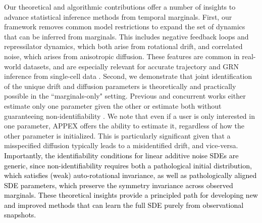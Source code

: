 \documentclass[twoside,11pt]{article}
\newcommand{\rv}[1]{\textcolor{black}{#1}}
\begin{document}
Our theoretical and algorithmic contributions offer a number of insights to advance statistical inference methods from temporal marginals. First, our framework removes common model restrictions to expand the set of dynamics that can be inferred from marginals. This includes negative feedback loops and repressilator dynamics, which both arise from rotational drift, and correlated noise, which arises from anisotropic diffusion. These features are common in real-world datasets, and are especially relevant for accurate trajectory and GRN inference from single-cell data \citep{weinreb2018fundamental,santos2024learning}. Second, we demonstrate that joint identification of the unique drift and diffusion parameters is theoretically and practically possible in the ``marginals-only" setting. Previous and concurrent works either estimate only one parameter given the other \citep{weinreb2018fundamental,lavenant2021towards, chizat2022trajectory, shen2024learning,zhang2024joint,forrow2024consistent} or estimate both without guaranteeing non-identifiability \citep{terpin2024learning, brogat2024learning}. We note that even if a user is only interested in one parameter, APPEX offers the ability to estimate it, regardless of how the other parameter is initialized. This is particularly significant given that a misspecified diffusion typically leads to a misidentified drift, and vice-versa. \rv{Importantly, the identifiability conditions for linear additive noise SDEs are generic, since non-identifiability requires both a pathological initial distribution, which satisfies (weak) auto-rotational invariance, as well as pathologically aligned SDE parameters, which preserve the symmetry invariance across observed marginals. These theoretical insights provide a principled path for developing new and improved methods that can learn the full SDE purely from observational snapshots.}






\end{document}
